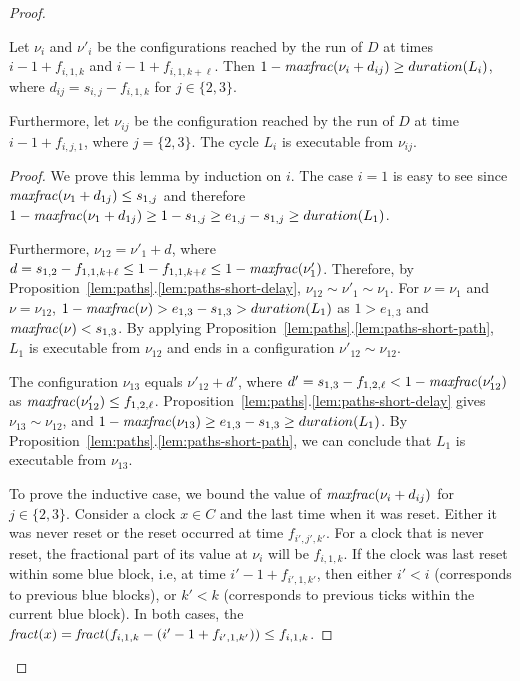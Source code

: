 \documentclass[10pt,a4paper]{amsart}
\theoremstyle{definition}
\numberwithin{equation}{section}
\newcommand{\fractof}[1]{{\it fract}(#1)} %
\newcommand{\maxfractof}[1]{{\it maxfrac}(#1)}
\newcommand{\clocks}{C}
\newcommand{\dur}[1]{\mathop{duration}(#1)}
\newcommand{\req}{\sim}
\newcommand{\bstart}[2]{s_{#1,#2}}
\newcommand{\bend}[2]{e_{#1,#2}}
\newcommand{\tick}[3]{f_{#1,#2,#3}}
\begin{document}
\begin{proof}
\begin{lemma}
	\label{lem:safe}
Let $\nu_i$ and $\nu'_{i}$ be the configurations reached by the run of $D$ at times $i-1+\tick{i}{1}{k}$ and $i-1+\tick{i}{1}{k+\ell}$.
Then $1-\maxfractof{\nu_i+d_{ij}}\geq \dur{L_i} $, where $d_{ij}=\bstart{i}{j}- \tick{i}{1}{k}$ for $j\in \{2,3\}$.

Furthermore, let $\nu_{ij}$ be the configuration reached by the run of $D$ at time $i-1 + \tick{i}{j}{1}$, where $j=\{2,3\}$. The cycle $L_i$ is executable from $\nu_{ij}$.


\end{lemma}

\begin{proof}
	We prove this lemma by induction on $i$.
	The case $i=1$ is easy to see since
	$\maxfractof{\nu_1+d_{1j}} \leq \bstart{1}{j}$ and therefore $1-\maxfractof{\nu_1+d_{1j}}\geq 1-\bstart{1}{j}\geq \bend{1}{j}-\bstart{1}{j}\geq \dur{L_1}$.
	
    Furthermore, $\nu_{12}=\nu'_{1}+d$, where $d=\bstart{1}{2}-\tick{1}{1}{k+\ell}\leq 1-\tick{1}{1}{k+\ell}\leq 1- \maxfractof{\nu'_1}$. Therefore, by Proposition~\ref{lem:paths}.\ref{lem:paths-short-delay},  $\nu_{12}\req \nu'_1\req \nu_1$. 
	For $\nu= \nu_{1}$ and $\nu=\nu_{12}$, $1-\maxfractof{\nu}> \bend{1}{3}-\bstart{1}{3}>\dur{L_1}$
	as $1>\bend{1}{3}$ and $\maxfractof{\nu}<\bstart{1}{3}$.
	By applying Proposition~\ref{lem:paths}.\ref{lem:paths-short-path}, $L_1$ is executable from $\nu_{12}$ and ends in a configuration $\nu'_{12}\req \nu_{12}$. 
	
    The configuration $\nu_{13}$ equals $\nu'_{12}+d'$, where $d'= \bstart{1}{3}- \tick{1}{2}{\ell}< 1-\maxfractof{\nu'_{12}}$ as $\maxfractof{\nu'_{12}}\leq  \tick{1}{2}{\ell}$.
    Proposition~\ref{lem:paths}.\ref{lem:paths-short-delay} gives $\nu_{13}\req \nu_{12}$, and $1-\maxfractof{\nu_{13}}\geq \bend{1}{3}-\bstart{1}{3}\geq \dur{L_1}$. By Proposition~\ref{lem:paths}.\ref{lem:paths-short-path}, we can conclude that $L_1$ is executable from $\nu_{13}$.
	
	To prove the inductive case, we bound the value of $\maxfractof{\nu_i + d_{ij}}$ for $j\in\{2,3\}$. Consider a clock $x\in \clocks$ and the last time when it was reset. Either it was never reset or the reset occurred at time $\tick{i'}{j'}{k'}$. 
	For a clock that is never reset, the fractional part of its value at $\nu_i$ will be $\tick{i}{1}{k}$. 
	If the clock was last reset within some blue block, i.e, at time $i'-1+\tick{i'}{1}{k'}$,  then either $i'<i$ (corresponds to previous blue blocks), or $k'<k$ (corresponds to previous ticks within the current blue block).
	In both cases, the $\fractof{x}= \fractof{\tick{i}{1}{k}-(i'-1 +\tick{i'}{1}{k'})}\leq  \tick{i}{1}{k}$. 
	

\end{proof}
\end{proof}
\end{document}
